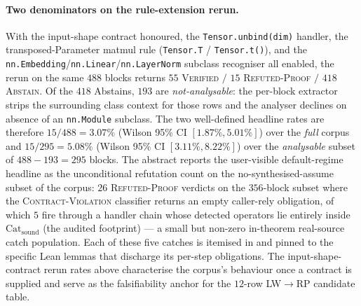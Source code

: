 \paragraph{Two denominators on the rule-extension rerun.}
With the input-shape contract honoured, the
\texttt{Tensor.unbind(dim)} handler, the transposed-Parameter
matmul rule (\texttt{Tensor.T} / \texttt{Tensor.t()}), and the
\texttt{nn.Embedding}/\texttt{nn.Linear}/\texttt{nn.LayerNorm} subclass
recogniser all enabled, the rerun on the same
$488$ blocks returns $55$ \textsc{Verified} $/$ $15$
\textsc{Refuted-Proof} $/$ $418$ \textsc{Abstain}. Of the
$418$ Abstains, $193$ are \emph{not-analysable}: the per-block
extractor strips the surrounding class context for those rows and
the analyser declines on absence of an \texttt{nn.Module}
subclass. The two well-defined headline rates are therefore
$15/488 = 3.07\%$ (Wilson 95\% CI $[1.87\%, 5.01\%]$) over the
\emph{full} corpus and
$15/295 = 5.08\%$ (Wilson 95\% CI $[3.11\%, 8.22\%]$) over the
\emph{analysable} subset of $488 - 193 = 295$ blocks. The
abstract reports the user-visible default-regime headline as
the unconditional refutation count on the no-synthesised-assume
subset of the corpus: $26$ \textsc{Refuted-Proof} verdicts on
the $356$-block subset where the \textsc{Contract-Violation}
classifier returns an empty caller-rely obligation, of which
$5$ fire through a handler chain whose detected operators lie
entirely inside $\mathrm{Cat}_{\mathrm{sound}}$ (the audited
footprint) --- a small but non-zero in-theorem real-source
catch population. Each of these five catches is itemised
in  and pinned to
the specific Lean lemmas that discharge its per-step
obligations. The input-shape-contract rerun rates above
characterise the corpus's behaviour once a contract is supplied
and serve as the falsifiability anchor for the $12$-row
LW$\to$RP candidate table.

